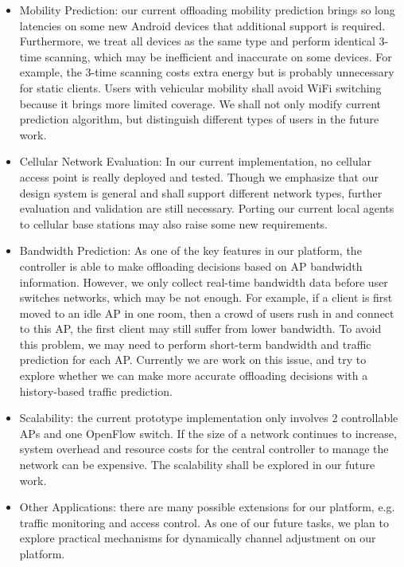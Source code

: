 \documentclass[english]{tktltiki}
\begin{document}
\begin{itemize}
  \item Mobility Prediction: our current offloading mobility prediction brings so long latencies on some new Android devices that additional support is required. Furthermore, we treat all devices as the same type and perform identical 3-time scanning, which may be inefficient and inaccurate on some devices. For example, the 3-time scanning costs extra energy but is probably unnecessary for static clients. Users with vehicular mobility shall avoid WiFi switching because it brings more limited coverage. We shall not only modify current prediction algorithm, but distinguish different types of users in the future work.
  \item Cellular Network Evaluation: In our current implementation, no cellular access point is really deployed and tested. Though we emphasize that our design system is general and shall support different network types, further evaluation and validation are still necessary. Porting our current local agents to cellular base stations may also raise some new requirements.
  \item Bandwidth Prediction: As one of the key features in our platform, the controller is able to make offloading decisions based on AP bandwidth information. However, we only collect real-time bandwidth data before user switches networks, which may be not enough. For example, if a client is first moved to an idle AP in one room, then a crowd of users rush in and connect to this AP, the first client may still suffer from lower bandwidth. To avoid this problem, we may need to perform short-term bandwidth and traffic prediction for each AP. Currently we are work on this issue, and try to explore whether we can make more accurate offloading decisions with a history-based traffic prediction.
  \item Scalability: the current prototype implementation only involves 2 controllable APs and one OpenFlow switch. If the size of a network continues to increase, system overhead and resource costs for the central controller to manage the network can be expensive. The scalability shall be explored in our future work.
  \item Other Applications: there are many possible extensions for our platform, e.g. traffic monitoring and access control. As one of our future tasks, we plan to explore practical mechanisms for dynamically channel adjustment on our platform. 
\end{itemize}


\newpage

\nocite{*}



\lastpage
\end{document}
